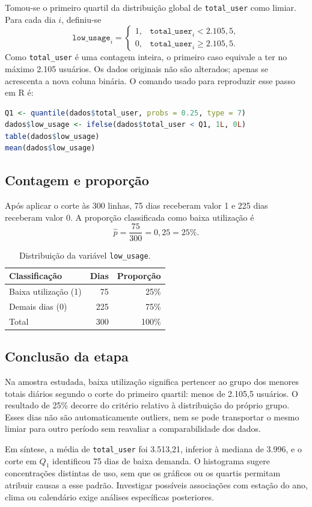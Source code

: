 \documentclass[12pt,a4paper]{article}
\begin{document}
Tomou-se o primeiro quartil da distribuição global de
\texttt{total\_user} como limiar. Para cada dia $i$, definiu-se
\begin{equation}
\texttt{low\_usage}_i=
\begin{cases}
1,&\texttt{total\_user}_i<2.105{,}5,\\
0,&\texttt{total\_user}_i\geq 2.105{,}5.
\end{cases}
\end{equation}
Como \texttt{total\_user} é uma contagem inteira, o primeiro caso equivale
a ter no máximo 2.105 usuários. Os dados originais não são alterados; apenas
se acrescenta a nova coluna binária. O comando usado para reproduzir esse
passo em R é:
\begin{lstlisting}[language=R]
Q1 <- quantile(dados$total_user, probs = 0.25, type = 7)
dados$low_usage <- ifelse(dados$total_user < Q1, 1L, 0L)
table(dados$low_usage)
mean(dados$low_usage)
\end{lstlisting}

\subsection{Contagem e proporção}

Após aplicar o corte às 300 linhas, 75 dias receberam valor 1 e 225 dias
receberam valor 0. A proporção classificada como baixa utilização é
\begin{equation}
\widehat{p}=\frac{75}{300}=0{,}25=25\%.
\end{equation}

\begin{table}[H]
\centering
\caption{Distribuição da variável \texttt{low\_usage}.}
\begin{tabular}{lrr}
\toprule
Classificação & Dias & Proporção \\
\midrule
Baixa utilização (1) & 75 & 25\% \\
Demais dias (0) & 225 & 75\% \\
\midrule
Total & 300 & 100\% \\
\bottomrule
\end{tabular}
\end{table}

\subsection{Conclusão da etapa}

Na amostra estudada, baixa utilização significa pertencer ao grupo dos
menores totais diários segundo o corte do primeiro quartil: menos de
2.105,5 usuários. O resultado de 25\% decorre do critério relativo à
distribuição do próprio grupo. Esses dias não são automaticamente outliers,
nem se pode transportar o mesmo limiar para outro período sem reavaliar a
comparabilidade dos dados.

Em síntese, a média de \texttt{total\_user} foi 3.513,21, inferior à
mediana de 3.996, e o corte em $Q_1$ identificou 75 dias de baixa demanda.
O histograma sugere concentrações distintas de uso, sem que os gráficos ou
os quartis permitam atribuir causas a esse padrão. Investigar possíveis
associações com estação do ano, clima ou calendário exige análises
específicas posteriores.
\end{document}
